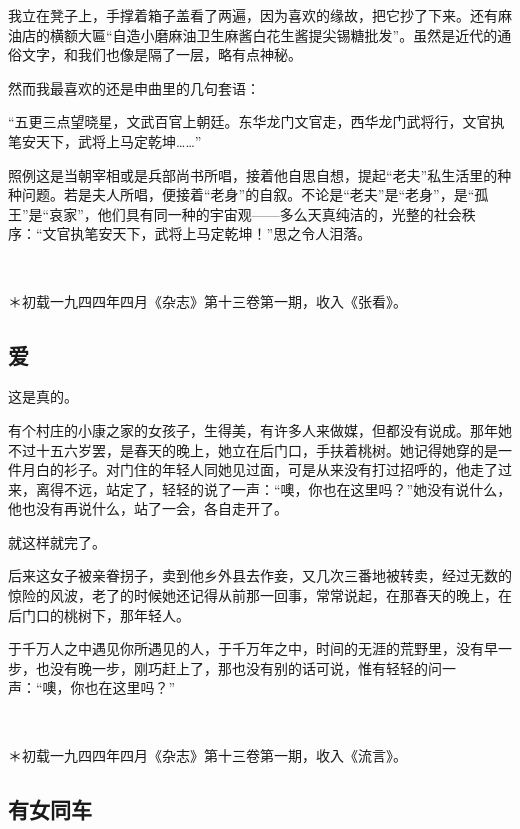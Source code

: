 \par 我立在凳子上，手撑着箱子盖看了两遍，因为喜欢的缘故，把它抄了下来。还有麻油店的横额大匾“自造小磨麻油卫生麻酱白花生酱提尖锡糖批发”。虽然是近代的通俗文字，和我们也像是隔了一层，略有点神秘。
\par 然而我最喜欢的还是申曲里的几句套语：
\par “五更三点望晓星，文武百官上朝廷。东华龙门文官走，西华龙门武将行，文官执笔安天下，武将上马定乾坤……”
\par 照例这是当朝宰相或是兵部尚书所唱，接着他自思自想，提起“老夫”私生活里的种种问题。若是夫人所唱，便接着“老身”的自叙。不论是“老夫”是“老身”，是“孤王”是“哀家”，他们具有同一种的宇宙观——多么天真纯洁的，光整的社会秩序：“文官执笔安天下，武将上马定乾坤！”思之令人泪落。
\par {}
\par  
\par ＊初载一九四四年四月《杂志》第十三卷第一期，收入《张看》。


\subsection{爱}

\par 这是真的。
\par 有个村庄的小康之家的女孩子，生得美，有许多人来做媒，但都没有说成。那年她不过十五六岁罢，是春天的晚上，她立在后门口，手扶着桃树。她记得她穿的是一件月白的衫子。对门住的年轻人同她见过面，可是从来没有打过招呼的，他走了过来，离得不远，站定了，轻轻的说了一声：“噢，你也在这里吗？”她没有说什么，他也没有再说什么，站了一会，各自走开了。
\par 就这样就完了。
\par 后来这女子被亲眷拐子，卖到他乡外县去作妾，又几次三番地被转卖，经过无数的惊险的风波，老了的时候她还记得从前那一回事，常常说起，在那春天的晚上，在后门口的桃树下，那年轻人。
\par 于千万人之中遇见你所遇见的人，于千万年之中，时间的无涯的荒野里，没有早一步，也没有晚一步，刚巧赶上了，那也没有别的话可说，惟有轻轻的问一声：“噢，你也在这里吗？”
\par  
\par ＊初载一九四四年四月《杂志》第十三卷第一期，收入《流言》。


\subsection{有女同车}

